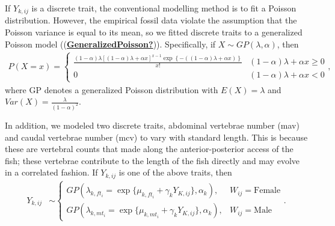 \documentclass[
  12pt,
]{article}
\begin{document}
If \(Y_{k,ij}\) is a discrete trait, the conventional modelling method
is to fit a Poisson distribution. However, the empirical fossil data
violate the assumption that the Poisson variance is equal to its mean,
so we fitted discrete traits to a generalized Poisson model
((\protect\hyperlink{ref-GeneralizedPoisson}{\textbf{GeneralizedPoisson?}})).
Specifically, if \(X \sim GP(\lambda,\alpha)\), then \begin{align}
P(X = x) = \left\{\begin{array}{cc} \frac{(1 - \alpha)\lambda[(1 - \alpha)\lambda + \alpha x]^{x - 1} \exp\left\{-((1 - \alpha)\lambda  + \alpha x)\right\}}{x!} & (1 - \alpha)\lambda  + \alpha x \geq 0  \\ 0 & (1 - \alpha)\lambda  + \alpha x < 0 \end{array}\right.,
\label{eq:GP_pmf}
\end{align} where GP denotes a generalized Poisson distribution with
\(E(X) = \lambda\) and \(Var(X) = \frac{\lambda}{(1 - \alpha)^2}\).

In addition, we modeled two discrete traits, abdominal vertebrae number
(mav) and caudal vertebrae number (mcv) to vary with standard length.
This is because these are vertebral counts that made along the
anterior-posterior access of the fish; these vertebrae contribute to the
length of the fish directly and may evolve in a correlated fashion. If
\(Y_{k,ij}\) is one of the above traits, then \begin{align}
{Y}_{k,ij} & \sim \left\{\begin{array}{ll} GP(\lambda_{k,ft_i} = \exp\{\mu_{k,ft_i} + \gamma_kY_{K,ij}\},\alpha_k), & W_{ij} = \text{Female} \\ GP(\lambda_{k,mt_i} = \exp\{\mu_{k,mt_i} + \gamma_kY_{K,ij}\},\alpha_k), & W_{ij} = \text{Male} \end{array}\right..
\label{eq:disc_corr}
\end{align}
\end{document}
